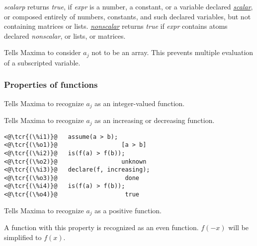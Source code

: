 \documentclass[../Maxima_Workbook.tex]{subfiles}
\begin{document}
 \hfill {}

\lz \emph{scalarp} returns \emph{true}, if \emph{expr} is a number, a constant, or a variable declared \hyperlink{scalar}{\emph{scalar}}, or composed entirely of numbers, constants, and such declared variables, but not containing matrices or lists. \hyperlink{nonscalar}{\emph{nonscalar}} returns \emph{true} if \emph{expr} contains atoms declared \emph{nonscalar}, or lists, or matrices.

\lzz {} \hfill \tcr{[property]}

\lz Tells Maxima to consider $ a_j $ not to be an array. This prevents multiple evaluation of a subscripted variable.

\subsubsection{Properties of functions}

\lz {} \hfill \tcr{[property]}

\lz Tells Maxima to recognize $ a_j $ as an integer-valued function.

\lzz {} \hfill \tcr{[property]}

 \hfill \tcr{[property]}

\lz Tells Maxima to recognize $ a_j $ as an increasing or decreasing function.

\lz \begin{lstlisting}
<@\tcr{(\%i1)}@   assume(a > b);
<@\tcr{(\%o1)}@   			     [a > b]
<@\tcr{(\%i2)}@   is(f(a) > f(b));
<@\tcr{(\%o2)}@   			     unknown
<@\tcr{(\%i3)}@   declare(f, increasing);
<@\tcr{(\%o3)}@   			      done
<@\tcr{(\%i4)}@   is(f(a) > f(b));
<@\tcr{(\%o4)}@   			      true
\end{lstlisting}

\lzz {} \hfill \tcr{[property]}

\lz Tells Maxima to recognize $ a_j $ as a positive function.

\lzz {} \hfill \tcr{[property]}

\lz A function with this property is recognized as an even function. $ f(-x) $ will be simplified to $ f(x) $.
\end{document}
